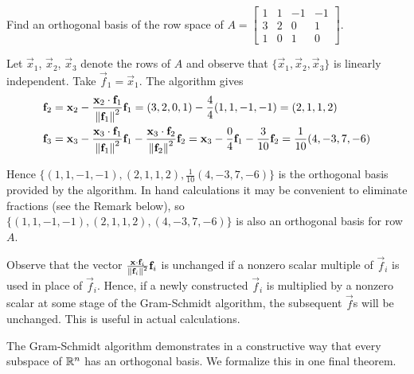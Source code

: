 \documentclass{ximera}
\begin{document}

\begin{example}\label{023743}
Find an orthogonal basis of the row space of $A = \begin{bmatrix}
1 & 1 & -1 & -1\\
3 & 2 & 0 & 1\\
1 & 0 & 1 & 0
\end{bmatrix}$.

\begin{explanation}
  Let $\vec{x}_{1}$, $\vec{x}_{2}$, $\vec{x}_{3}$ denote the rows of $A$ and observe that $\{\vec{x}_{1}, \vec{x}_{2}, \vec{x}_{3}\}$ is linearly independent. Take $\vec{f}_{1} = \vec{x}_{1}$. The algorithm gives
\begin{align*}
\mathbf{f}_{2} &= \mathbf{x}_{2} - \frac{\mathbf{x}_{2} \cdot \mathbf{f}_{1}}{\left\lVert\mathbf{f}_{1}\right\rVert^2}\mathbf{f}_{1} = (3, 2, 0, 1) - \frac{4}{4}(1, 1, -1, -1) = (2, 1, 1, 2) \\
\mathbf{f}_{3} &= \mathbf{x}_{3} - \frac{\mathbf{x}_{3} \cdot \mathbf{f}_{1}}{\left\lVert\mathbf{f}_{1}\right\rVert^2}\mathbf{f}_{1} - \frac{\mathbf{x}_{3} \cdot \mathbf{f}_{2}}{\left\lVert\mathbf{f}_{2}\right\rVert^2}\mathbf{f}_{2} = \mathbf{x}_{3} - \frac{0}{4}\mathbf{f}_{1} - \frac{3}{10}\mathbf{f}_{2} = \frac{1}{10}(4, -3, 7, -6)
\end{align*}

Hence $\{(1, 1, -1, -1), (2, 1, 1, 2), \frac{1}{10}(4, -3, 7, -6)\}$ is the orthogonal basis provided by the algorithm. In
hand calculations it may be convenient to eliminate fractions (see the Remark below), so $\{(1, 1, -1, -1), (2, 1, 1, 2), (4, -3, 7, -6)\}$ is also an orthogonal basis for row $A$.
\end{explanation}
\end{example}

\begin{remark}
Observe that the vector $\frac{\mathbf{x} \cdot \mathbf{f}_{i}}{\left\lVert\mathbf{f}_{i}\right\rVert^2}\mathbf{f}_{i}$
 is unchanged if a nonzero scalar multiple of $\vec{f}_{i}$ is used in place of $\vec{f}_{i}$. Hence, if a newly constructed $\vec{f}_{i}$ is multiplied by a nonzero scalar at some stage of the Gram-Schmidt algorithm, the subsequent $\vec{f}$s will be unchanged. This is useful in actual calculations.
 \end{remark}

The Gram-Schmidt algorithm demonstrates in a constructive way that every subspace of $\mathbb{R}^n$ has an orthogonal basis.  We formalize this in one final theorem.
\end{document}
